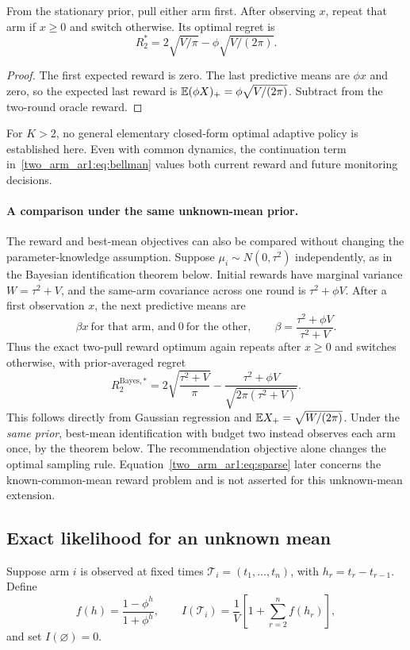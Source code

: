 \begin{corollary}
From the stationary prior, pull either arm first. After observing $x$, repeat that arm if $x\geq0$ and switch otherwise. Its optimal regret is
\begin{equation}
\boxed{R_2^*=2\sqrt{V/\pi}-\phi\sqrt{V/(2\pi)}.}
\label{two_arm_ar1:eq:R2}
\end{equation}
\end{corollary}
\begin{proof}
The first expected reward is zero. The last predictive means are $\phi x$ and zero, so the expected last reward is $\mathbb E(\phi X)_+=\phi\sqrt{V/(2\pi)}$. Subtract from the two-round oracle reward.
\end{proof}
For $K>2$, no general elementary closed-form optimal adaptive policy is established here. Even with common dynamics, the continuation term in~\eqref{two_arm_ar1:eq:bellman} values both current reward and future monitoring decisions.

\paragraph{A comparison under the same unknown-mean prior.}
The reward and best-mean objectives can also be compared without changing the parameter-knowledge assumption. Suppose $\mu_i\sim N(0,\tau^2)$ independently, as in the Bayesian identification theorem below. Initial rewards have marginal variance $W=\tau^2+V$, and the same-arm covariance across one round is $\tau^2+\phi V$. After a first observation $x$, the next predictive means are
\[
\beta x\ \text{for that arm, and}\ 0\ \text{for the other},\qquad
\beta=\frac{\tau^2+\phi V}{\tau^2+V}.
\]
Thus the exact two-pull reward optimum again repeats after $x\geq0$ and switches otherwise, with prior-averaged regret
\begin{equation}
\boxed{R_2^{\mathrm{Bayes},*}
=2\sqrt{\frac{\tau^2+V}{\pi}}
-\frac{\tau^2+\phi V}{\sqrt{2\pi(\tau^2+V)}}.}
\label{two_arm_ar1:eq:bayes-regret2}
\end{equation}
This follows directly from Gaussian regression and $\mathbb E X_+=\sqrt{W/(2\pi)}$. Under the \emph{same prior}, best-mean identification with budget two instead observes each arm once, by the theorem below. The recommendation objective alone changes the optimal sampling rule. Equation~\eqref{two_arm_ar1:eq:sparse} later concerns the known-common-mean reward problem and is not asserted for this unknown-mean extension.

\subsection{Exact likelihood for an unknown mean}
Suppose arm $i$ is observed at fixed times $\mathcal T_i=(t_1,\ldots,t_n)$, with $h_r=t_r-t_{r-1}$. Define
\begin{equation}
f(h)=\frac{1-\phi^h}{1+\phi^h},\qquad
I(\mathcal T_i)=\frac1V\left[1+\sum_{r=2}^nf(h_r)\right],
\label{two_arm_ar1:eq:information}
\end{equation}
and set $I(\varnothing)=0$.


